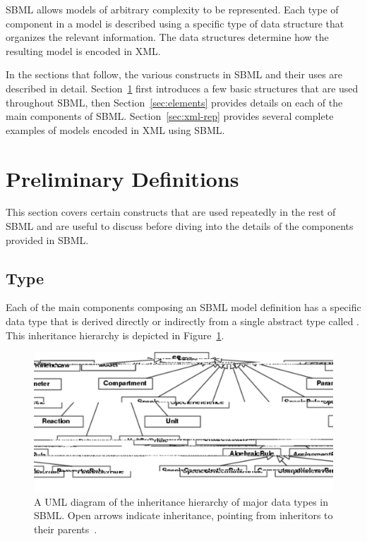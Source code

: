 \documentclass[10pt]{cekarticle}
\newcommand{\vref}[1]{\ref{#1}}
\newcommand{\changed}[1]{\textcolor{BrickRed}{#1}}
\begin{document}
SBML allows models of arbitrary complexity to be represented.  Each type of
component in a model is described using a specific type of data structure
that organizes the relevant information.  The data structures determine how
the resulting model is encoded in XML.

In the sections that follow, the various constructs in SBML and their uses
are described in detail.  Section~\ref{sec:general} first introduces a few
basic structures that are used throughout SBML, then
Section~\ref{sec:elements} provides details on each of the main components
of SBML.  Section~\ref{sec:xml-rep} provides several complete examples of
models encoded in XML using SBML.


\section{Preliminary Definitions}
\label{sec:general}

This section covers certain constructs that are used repeatedly in the rest
of SBML and are useful to discuss before diving into the details of the
components provided in SBML.

\subsection{Type }
\label{sec:sbase}

Each of the main components composing an SBML model definition has a
specific data type that is derived directly or indirectly from a single
\changed{abstract} type called .  This inheritance hierarchy
is depicted in Figure~\vref{fig:top-level}.

\begin{figure}[ht]
  \vspace*{8pt}
  \centering
  \includegraphics[scale = 0.7]{top-level}
  \caption{A UML diagram of the inheritance hierarchy of major data types
    in SBML.  Open arrows indicate inheritance, pointing from inheritors to 
    their parents~\citep{eriksson:1998,oestereich:1999}.}
  \label{fig:top-level}
\end{figure}
\end{document}
